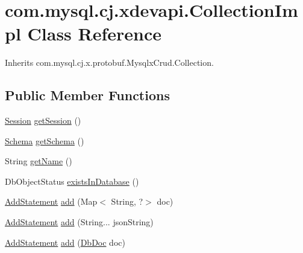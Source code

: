 \hypertarget{classcom_1_1mysql_1_1cj_1_1xdevapi_1_1_collection_impl}{}\section{com.\+mysql.\+cj.\+xdevapi.\+Collection\+Impl Class Reference}
\label{classcom_1_1mysql_1_1cj_1_1xdevapi_1_1_collection_impl}


Inherits com.\+mysql.\+cj.\+x.\+protobuf.\+Mysqlx\+Crud.\+Collection.

\subsection*{Public Member Functions}
\begin{DoxyCompactItemize}
\item 
\mbox{\hyperlink{interfacecom_1_1mysql_1_1cj_1_1xdevapi_1_1_session}{Session}} \mbox{\hyperlink{classcom_1_1mysql_1_1cj_1_1xdevapi_1_1_collection_impl_aae4626274d39779ff51b26441b362eea}{get\+Session}} ()
\item 
\mbox{\hyperlink{interfacecom_1_1mysql_1_1cj_1_1xdevapi_1_1_schema}{Schema}} \mbox{\hyperlink{classcom_1_1mysql_1_1cj_1_1xdevapi_1_1_collection_impl_a742cc33a72a7d2c8c8c88d0a5be7bc14}{get\+Schema}} ()
\item 
String \mbox{\hyperlink{classcom_1_1mysql_1_1cj_1_1xdevapi_1_1_collection_impl_acc988f8c9117edcd62a08b77dc9e2dde}{get\+Name}} ()
\item 
Db\+Object\+Status \mbox{\hyperlink{classcom_1_1mysql_1_1cj_1_1xdevapi_1_1_collection_impl_a0ea2f07a5a443cd2bc331d3b8c424ff9}{exists\+In\+Database}} ()
\item 
\mbox{\hyperlink{interfacecom_1_1mysql_1_1cj_1_1xdevapi_1_1_add_statement}{Add\+Statement}} \mbox{\hyperlink{classcom_1_1mysql_1_1cj_1_1xdevapi_1_1_collection_impl_a66d3e972cdbc3ab751a4ebbca12ca57e}{add}} (Map$<$ String, ?$>$ doc)
\item 
\mbox{\hyperlink{interfacecom_1_1mysql_1_1cj_1_1xdevapi_1_1_add_statement}{Add\+Statement}} \mbox{\hyperlink{classcom_1_1mysql_1_1cj_1_1xdevapi_1_1_collection_impl_a8a5eb95ee49f4281ee578cb161b186d7}{add}} (String... json\+String)
\item 
\mbox{\hyperlink{interfacecom_1_1mysql_1_1cj_1_1xdevapi_1_1_add_statement}{Add\+Statement}} \mbox{\hyperlink{classcom_1_1mysql_1_1cj_1_1xdevapi_1_1_collection_impl_a88f5836a8e460d3c819a3e5540cb50ff}{add}} (\mbox{\hyperlink{interfacecom_1_1mysql_1_1cj_1_1xdevapi_1_1_db_doc}{Db\+Doc}} doc)

\end{DoxyCompactItemize}
